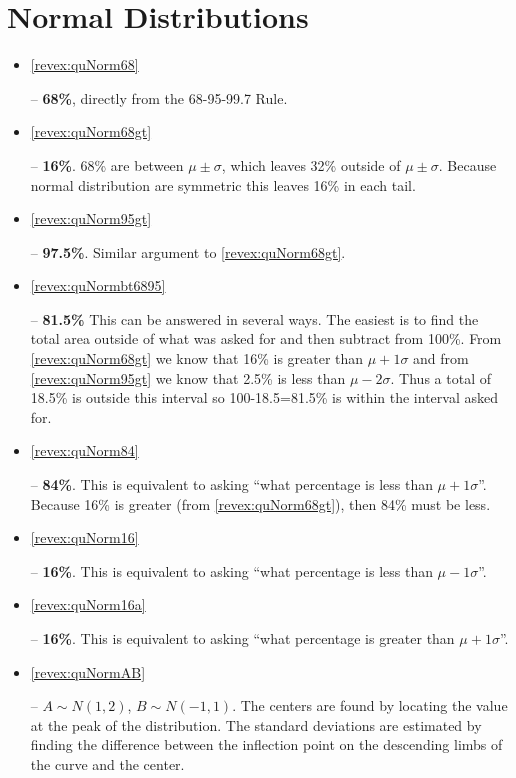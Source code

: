 \documentclass[10pt,openany]{book}\usepackage[]{graphicx}\usepackage[]{color}
\begin{document}
\begin{itemize}
\end{itemize}




\section*{Normal Distributions}
\begin{itemize}
  \item \hypertarget{ans:quNorm68}{\ref{revex:quNorm68}} --  \textbf{68\%}, directly from the 68-95-99.7 Rule.
  \item \hypertarget{ans:quNorm68gt}{\ref{revex:quNorm68gt}} --  \textbf{16\%}.  68\% are between $\mu\pm\sigma$, which leaves 32\% outside of $\mu\pm\sigma$.  Because normal distribution are symmetric this leaves 16\% in each tail.
  \item \hypertarget{ans:quNorm95gt}{\ref{revex:quNorm95gt}} --  \textbf{97.5\%}.  Similar argument to \ref{revex:quNorm68gt}.
  \item \hypertarget{ans:quNormbt6895}{\ref{revex:quNormbt6895}} --  \textbf{81.5\%}  This can be answered in several ways.  The easiest is to find the total area outside of what was asked for and then subtract from 100\%.  From \ref{revex:quNorm68gt} we know that 16\% is greater than $\mu+1\sigma$ and from \ref{revex:quNorm95gt} we know that 2.5\% is less than $\mu-2\sigma$.  Thus a total of 18.5\% is outside this interval so 100-18.5=81.5\% is within the interval asked for.
  \item \hypertarget{ans:quNorm84}{\ref{revex:quNorm84}} --  \textbf{84\%}.  This is equivalent to asking ``what percentage is less than $\mu+1\sigma$''.  Because 16\% is greater (from \ref{revex:quNorm68gt}), then 84\% must be less.
  \item \hypertarget{ans:quNorm16}{\ref{revex:quNorm16}} --  \textbf{16\%}.  This is equivalent to asking ``what percentage is less than $\mu-1\sigma$''.
  \item \hypertarget{ans:quNorm16a}{\ref{revex:quNorm16a}} --  \textbf{16\%}.  This is equivalent to asking ``what percentage is greater than $\mu+1\sigma$''.
  \item \hypertarget{ans:quNormAB}{\ref{revex:quNormAB}} --  $A\sim N(1,2)$, $B\sim N(-1,1)$.  The centers are found by locating the value at the peak of the distribution.  The standard deviations are estimated by finding the difference between the inflection point on the descending limbs of the curve and the center.


\end{itemize}
\end{document}
